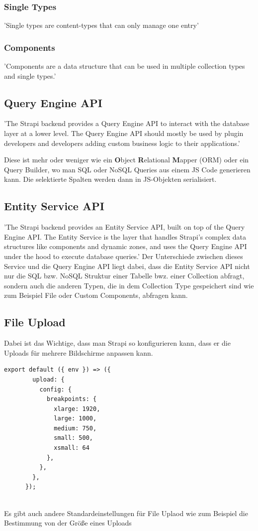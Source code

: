 \subsubsection{Single Types}
'Single types are content-types that can only manage one entry'
\cite{collection-types}

\subsubsection*{Components}
'Components are a data structure that can be used in multiple collection types and single types.'
\cite{collection-types}

\subsection{Query Engine API}
'The Strapi backend provides a Query Engine API to interact with the database layer at a lower level.
The Query Engine API should mostly be used by plugin developers and developers adding custom business logic
to their applications.'
\cite{query-engine-api}

Diese ist mehr oder weniger wie ein \textbf{O}bject \textbf{R}elational \textbf{M}apper (ORM) oder ein Query Builder, wo man SQL oder NoSQL Queries aus einem JS Code generieren kann. Die selektierte Spalten werden dann in JS-Objekten serialisiert.

\subsection{Entity Service API}
'The Strapi backend provides an Entity Service API, built on top of the Query Engine API. The Entity Service is the layer that handles Strapi's complex data structures like components and dynamic zones, and uses the Query Engine API under the hood to execute database queries.'
Der Unterschiede zwischen dieses Service und die Query Engine API liegt dabei, dass die Entity Service API nicht nur die SQL bzw. NoSQL Struktur einer Tabelle bwz. einer Collection abfragt, sondern auch die anderen Typen, die in dem Collection Type gespeichert sind wie zum Beispiel File oder Custom Components, abfragen kann.
\cite{service-engine-api}
\subsection{File Upload}

Dabei ist das Wichtige, dass man Strapi so konfigurieren kann, dass er die Uploads für mehrere Bildschirme anpassen kann.
\begin{lstlisting}[caption=file upload config in strapi]
    export default ({ env }) => ({
        upload: {
          config: {
            breakpoints: {
              xlarge: 1920,
              large: 1000,
              medium: 750,
              small: 500,
              xsmall: 64
            },
          },
        },
      });
    
\end{lstlisting}
Es gibt auch andere Standardeinstellungen für File Uplaod wie zum Beispiel die Bestimmung von der Größe eines Uploads
\cite{upload}

